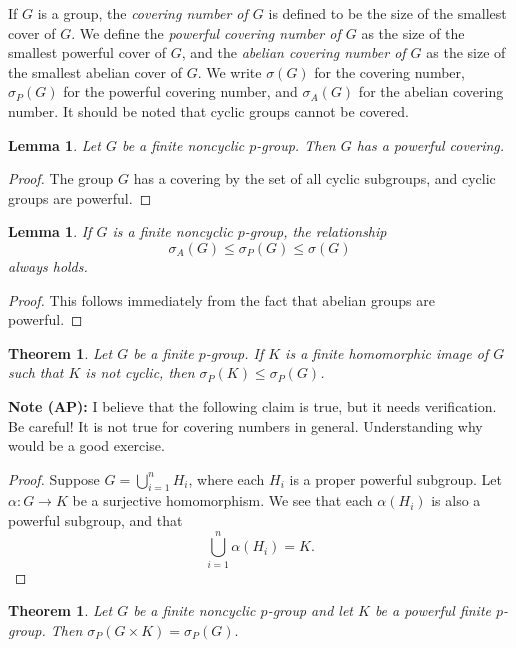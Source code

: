 \documentclass{amsart}
\numberwithin{equation} {section}
\newtheorem{theorem}[equation]{Theorem}
\newtheorem{lemma}[equation]{Lemma}
\theoremstyle{definition}
\begin{document}
If $G$ is a group, the \textit{covering number of $G$} is defined to be the size of the smallest cover of $G$. We define the \textit{powerful covering number of $G$} as the size of the smallest powerful cover of $G$, and the \textit{abelian covering number of $G$} as the size of the smallest abelian cover of $G$. We write $\sigma(G)$ for the covering number, $\sigma_P(G)$ for the powerful covering number, and $\sigma_A(G)$ for the abelian covering number. It should be noted that cyclic groups cannot be covered.

\begin{lemma}\label{l:all-p-groups-have-powerful-covers}
Let $G$ be a finite noncyclic $p$-group. Then $G$ has a powerful covering.
\end{lemma}

\begin{proof}
The group $G$ has a covering by the set of all cyclic subgroups, and cyclic groups are powerful. 
\end{proof}

\begin{lemma}\label{l:powerful-abelian-covering-relationship}
If $G$ is a finite noncyclic $p$-group, the relationship
\[
\sigma_{A}(G) \leq \sigma_{P}(G) \leq \sigma(G)
\]
always holds. 
\end{lemma}

\begin{proof}
This follows immediately from the fact that abelian groups are powerful. 
\end{proof}

\begin{theorem}
Let $G$ be a finite $p$-group. If $K$ is a finite homomorphic image of $G$ such that $K$ is not cyclic, then $\sigma_P(K) \leq \sigma_P(G)$.
\end{theorem}

\textbf{Note (AP):} I believe that the following claim is true, but it needs verification. Be careful! It is not true for covering numbers in general. Understanding why would be a good exercise. 

\begin{proof}
 Suppose $G = \bigcup_{i=1}^n H_i$, where each $H_i$ is a proper powerful subgroup. Let $\alpha: G \rightarrow K$ be a surjective homomorphism. We see that each $\alpha(H_i)$ is also a powerful subgroup, and that \[
 \bigcup_{i=1}^n \alpha\left(H_i\right) = K.
 \]
\end{proof}

\begin{theorem}
Let $G$ be a finite noncyclic $p$-group and let $K$ be a powerful finite $p$-group. Then $\sigma_P(G \times K) = \sigma_P(G).$
\end{theorem}
\end{document}
